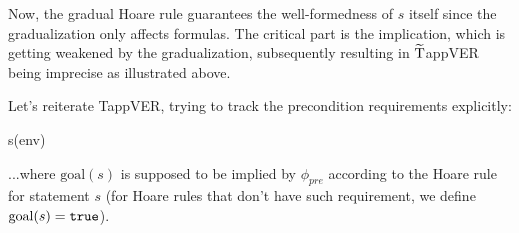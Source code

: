 \documentclass[11pt,a4paper]{article}
\begin{document}
\begin{description}
	Now, the gradual Hoare rule guarantees the well-formedness of $s$ itself since the gradualization only affects formulas.
	The critical part is the implication, which is getting weakened by the gradualization, subsequently resulting in $\widetilde{\text{T}}$appVER being imprecise as illustrated above.
	
	Let's reiterate TappVER, trying to track the precondition requirements explicitly:
	\begin{mathpar}
		{ s(env) \vdash {}}
	\end{mathpar}
	...where $\text{goal}(s)$ is supposed to be implied by $\phi_{pre}$ according to the Hoare rule for statement $s$
	(for Hoare rules that don't have such requirement, we define $\text{goal}(s) = \texttt{true}$).
	

\end{description}
\end{document}
